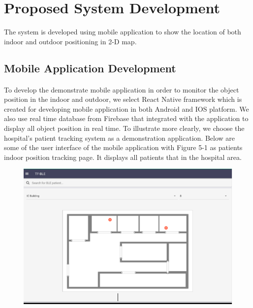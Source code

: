 \section{Proposed System Development}
\paragraph{}The system is developed using mobile application to show the location of both indoor and outdoor positioning in 2-D map.
\subsection{Mobile Application Development}
\paragraph{}To develop the demonstrate mobile application in order to monitor the object position in the indoor and outdoor, we select React Native framework which is created for developing mobile application in both Android and IOS platform. We also use real time database from Firebase that integrated with the application to display all object position in real time. To illustrate more clearly, we choose the hospital’s patient tracking system as a demonstration application. Below are some of the user interface of the mobile application with Figure 5-1 as patients indoor position tracking page. It displays all patients that in the hospital area.

\begin{figure}[h]
\centering
\includegraphics[width=\textwidth]{Image/bright1.png}
\caption{}
\label{bright1}
\end{figure}

